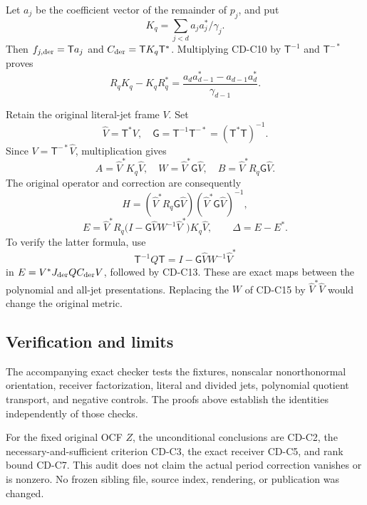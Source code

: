 \documentclass[11pt]{article}
\begin{document}
Let \(a_j\) be the coefficient vector of the remainder of \(p_j\), and put \[
K_q=\sum_{j<d}a_ja_j^*/\gamma_j.
\] Then \(f_{j,\rm der}=\mathsf T a_j\) and \(C_{\rm der}=\mathsf T K_q\mathsf T^*\). Multiplying CD-C10 by \(\mathsf T^{-1}\) and \(\mathsf T^{-*}\) proves \[
R_qK_q-K_qR_q^*
=\frac{a_da_{d-1}^*-a_{d-1}a_d^*}{\gamma_{d-1}}.
\tag{CD-C14}
\]

Retain the original literal-jet frame \(V\). Set \[
\widehat V=\mathsf T^*V,\quad
\mathsf G=\mathsf T^{-1}\mathsf T^{-*}=(\mathsf T^*\mathsf T)^{-1}.
\] Since \(V=\mathsf T^{-*}\widehat V\), multiplication gives \[
A=\widehat V^*K_q\widehat V,\quad
W=\widehat V^*\mathsf G\widehat V,\quad
B=\widehat V^*R_q\mathsf G\widehat V.
\tag{CD-C15}
\] The original operator and correction are consequently \[
H=(\widehat V^*R_q\mathsf G\widehat V)
(\widehat V^*\mathsf G\widehat V)^{-1},
\] \[
E=\widehat V^*R_q
\bigl(I-\mathsf G\widehat VW^{-1}\widehat V^*\bigr)
K_q\widehat V,\qquad \Delta=E-E^*.
\tag{CD-C16}
\] To verify the latter formula, use \[
\mathsf T^{-1}Q\mathsf T
=I-\mathsf G\widehat VW^{-1}\widehat V^*
\] in \(E=V^*J_{\rm der}QC_{\rm der}V\), followed by CD-C13. These are exact maps between the polynomial and all-jet presentations. Replacing the \(W\) of CD-C15 by \(\widehat V^*\widehat V\) would change the original metric.

\subsection{Verification and limits}\label{verification-and-limits}

The accompanying exact checker tests the fixtures, nonscalar nonorthonormal orientation, receiver factorization, literal and divided jets, polynomial quotient transport, and negative controls. The proofs above establish the identities independently of those checks.

For the fixed original OCF \(Z\), the unconditional conclusions are CD-C2, the necessary-and-sufficient criterion CD-C3, the exact receiver CD-C5, and rank bound CD-C7. This audit does not claim the actual period correction vanishes or is nonzero. No frozen sibling file, source index, rendering, or publication was changed.
\end{document}
